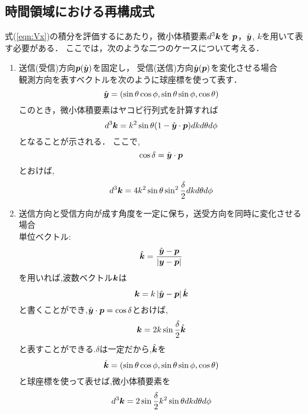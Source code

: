\subsection{時間領域における再構成式}
式(\ref{eqn:Vx})の積分を評価するにあたり，微小体積要素$d^3\mbox{\boldmath $k$}$を 
$\mbox{\boldmath $p$}$，$\hat{\mbox{\boldmath $y$}}$, $k$を用いて表す必要がある．
ここでは，次のような二つのケースについて考える．
\begin{enumerate}
\item
	送信(受信)方向$\mbox{\boldmath $p$}(\hat{\mbox{\boldmath $y$}})$を固定し，
	受信(送信)方向$\hat{\mbox{\boldmath $y$}}(\mbox{\boldmath $p$})$を変化させる場合\\

	観測方向を表すベクトルを次のように球座標を使って表す．
	\begin{equation}
		\hat{\mbox{\boldmath $y$}}=(\sin\theta\cos\phi,\sin\theta\sin\phi, \cos\theta)
		\label{eqn:}
	\end{equation}
	このとき，微小体積要素はヤコビ行列式を計算すれば
	\begin{equation}
		d^3\mbox{\boldmath $k$}=k^2\sin\theta (1-\hat{\mbox{\boldmath $y$}}\cdot\mbox{\boldmath $p$})dkd\theta d\phi
		\label{eqn:}
	\end{equation}
	となることが示される．
	ここで,
	\begin{equation}
		\cos\delta=\hat{\mbox{\boldmath $y$}}\cdot\mbox{\boldmath $p$}
		\label{eqn:}
	\end{equation}
	とおけば,
	\begin{equation}
		d^3\mbox{\boldmath $k$}=4k^2\sin\theta \sin^2 \frac{\delta}{2} dkd\theta d\phi
		\label{eqn:}
	\end{equation}
\item
	送信方向と受信方向が成す角度を一定に保ち，送受方向を同時に変化させる場合\\

	単位ベクトル:
	\begin{equation}
		\hat{\mbox{\boldmath $k$}}=\frac{\hat{\mbox{\boldmath $y$}}-\mbox{\boldmath $p$}}
		{\left| \mbox{\boldmath $y$}-\mbox{\boldmath $p$} \right| }
		\label{eqn:}
	\end{equation}
	を用いれば,波数ベクトル$\mbox{\boldmath $k$}$は
	\begin{equation}
		\mbox{\boldmath $k$}= k\left| \hat{\mbox{\boldmath $y$}}-\mbox{\boldmath $p$} \right| \hat{\mbox{\boldmath $k$}} 
		\label{eqn:}
	\end{equation}
	と書くことができ,$\hat{\mbox{\boldmath $y$}} \cdot \mbox{\boldmath $p$}= \cos \delta$とおけば,	
	\begin{equation}
		\mbox{\boldmath $k$}= 2k \sin \frac{\delta}{2}\hat{\mbox{\boldmath $k$}} 
	\label{eqn:}
	\end{equation}
	と表すことができる.$\delta$は一定だから,$\hat{\mbox{\boldmath $k$}}$を
	\begin{equation}
		\hat{\mbox{\boldmath $k$}}=(\sin\theta\cos\phi,\sin\theta\sin\phi, \cos\theta)
		\label{eqn:}
	\end{equation}
	と球座標を使って表せば,微小体積要素を
	\begin{equation}
		d^3\mbox{\boldmath $k$}=2\sin\frac{\delta}{2} 
		k^2 \sin\theta dkd\theta d\phi
		\label{eqn:}
	\end{equation}
\end{enumerate}
